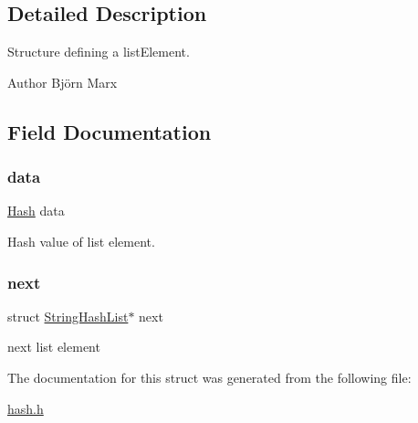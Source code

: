 \subsection{Detailed Description}
Structure defining a list\+Element. 

\begin{DoxyAuthor}{Author}
Björn Marx 
\end{DoxyAuthor}


\subsection{Field Documentation}
\mbox{\label{struct_string_hash_list_a0bb0e5ff64b92afb24dffc5a8835c55d}} 
\subsubsection{\texorpdfstring{data}{data}}
{\footnotesize\ttfamily \hyperlink{hash_8h_aaae8e320515f4ba6ab5e8bc4ecd7f58a}{Hash} data}



Hash value of list element. 

\mbox{\label{struct_string_hash_list_a61c5f91e0504062e5408438d1a3c1e78}} 
\subsubsection{\texorpdfstring{next}{next}}
{\footnotesize\ttfamily struct \hyperlink{struct_string_hash_list}{String\+Hash\+List}$\ast$ next}



next list element 



The documentation for this struct was generated from the following file\+:\begin{DoxyCompactItemize}
\item 
\hyperlink{hash_8h}{hash.\+h}\end{DoxyCompactItemize}
